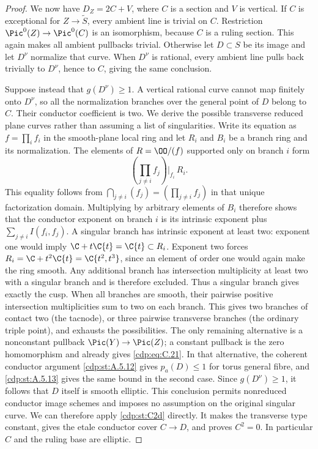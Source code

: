 \begin{proof}
We now have $D_Z=2C+V$, where $C$ is a section and $V$ is vertical. If $C$ is exceptional for $Z\to\widetilde S$, every ambient line is trivial on $C$. Restriction $\Pic^0(Z)\to\Pic^0(C)$ is an isomorphism, because $C$ is a ruling section. This again makes all ambient pullbacks trivial. Otherwise let $D\subset S$ be its image and let $D^\nu$ normalize that curve. When $D^\nu$ is rational, every ambient line pulls back trivially to $D^\nu$, hence to $C$, giving the same conclusion.

Suppose instead that $g(D^\nu)\ge1$. A vertical rational curve cannot map finitely onto $D^\nu$, so all the normalization branches over the general point of $D$ belong to $C$. Their conductor coefficient is two. We derive the possible transverse reduced plane curves rather than assuming a list of singularities. Write its equation as $f=\prod_i f_i$ in the smooth-plane local ring and let $R_i$ and $B_i$ be a branch ring and its normalization. The elements of $R=\OO/(f)$ supported only on branch $i$ form
\[
 \left(\prod_{j\ne i}f_j\right)\bigg|_{f_i}\,R_i.
\]
This equality follows from
$\bigcap_{j\ne i}(f_j)=(\prod_{j\ne i}f_j)$ in that unique
factorization domain. Multiplying by arbitrary elements of
$B_i$ therefore shows that the conductor exponent on branch $i$
is its intrinsic exponent plus $\sum_{j\ne i}I(f_i,f_j)$.
A singular branch has intrinsic exponent at least two:
exponent one would imply $\C+t\C\{t\}=\C\{t\}\subset R_i$.
Exponent two forces $R_i=\C+t^2\C\{t\}=\C\{t^2,t^3\}$,
since an element of order one would again make the ring smooth.
Any additional branch has intersection multiplicity at least
two with a singular branch and is therefore excluded. Thus a
singular branch gives exactly the cusp. When all branches are
smooth, their pairwise positive intersection multiplicities sum
to two on each branch. This gives two branches of contact two
(the tacnode), or three pairwise transverse branches (the
ordinary triple point), and exhausts the possibilities.
The only remaining alternative is a nonconstant pullback
$\Pic(Y)\to\Pic(Z)$; a constant pullback is the zero
homomorphism and already gives \eqref{cdp:eq:C.21}. In that alternative,
the coherent conductor argument \ref{cdp:st:A.5.12} gives $p_a(D)\le1$
for torus general fibre, and \ref{cdp:st:A.5.13} gives the same bound
in the second case.
Since $g(D^\nu)\ge1$, it follows that $D$ itself is smooth
elliptic. This conclusion permits nonreduced conductor image
schemes and imposes no assumption on the original singular
curve. We can therefore apply \ref{cdp:st:C2d} directly. It makes the
transverse type constant, gives the etale conductor cover
$C\to D$, and proves $C^2=0$. In particular $C$ and the
ruling base are elliptic.


\end{proof}
